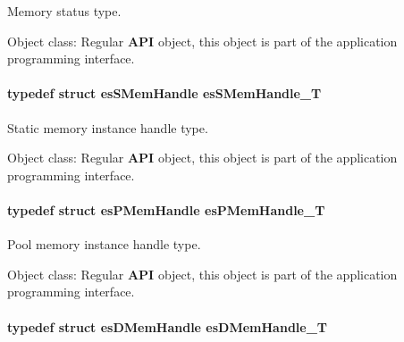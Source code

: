 Memory status type. 

\begin{DoxyParagraph}{Object class\-:}
Regular {\bfseries A\-P\-I} object, this object is part of the application programming interface. 
\end{DoxyParagraph}
\hypertarget{group__mem__intf_gabf19a317cc22713cfb45ae1e43d34d7e}{
\paragraph[{es\-S\-Mem\-Handle\-\_\-\-T}]{\setlength{\rightskip}{0pt plus 5cm}typedef struct {\bf es\-S\-Mem\-Handle} {\bf es\-S\-Mem\-Handle\-\_\-\-T}}}\label{group__mem__intf_gabf19a317cc22713cfb45ae1e43d34d7e}


Static memory instance handle type. 

\begin{DoxyParagraph}{Object class\-:}
Regular {\bfseries A\-P\-I} object, this object is part of the application programming interface. 
\end{DoxyParagraph}
\hypertarget{group__mem__intf_gaf82f01d26c4f6bc9a2b672a673b09ce2}{
\paragraph[{es\-P\-Mem\-Handle\-\_\-\-T}]{\setlength{\rightskip}{0pt plus 5cm}typedef struct {\bf es\-P\-Mem\-Handle} {\bf es\-P\-Mem\-Handle\-\_\-\-T}}}\label{group__mem__intf_gaf82f01d26c4f6bc9a2b672a673b09ce2}


Pool memory instance handle type. 

\begin{DoxyParagraph}{Object class\-:}
Regular {\bfseries A\-P\-I} object, this object is part of the application programming interface. 
\end{DoxyParagraph}
\hypertarget{group__mem__intf_gacaaf771b18b3da8fa3b67a466390080e}{
\paragraph[{es\-D\-Mem\-Handle\-\_\-\-T}]{\setlength{\rightskip}{0pt plus 5cm}typedef struct {\bf es\-D\-Mem\-Handle} {\bf es\-D\-Mem\-Handle\-\_\-\-T}}}\label{group__mem__intf_gacaaf771b18b3da8fa3b67a466390080e}


